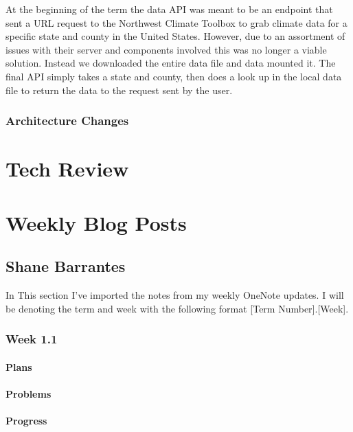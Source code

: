 \documentclass[onecolumn, draftclsnofoot,10pt, compsoc]{article}
\begin{document}
        At the beginning of the term the data API was meant to be an endpoint that sent a URL request to the Northwest Climate Toolbox to grab climate data for a specific state and county in the United States. However, due to an assortment of issues with their server and components involved this was no longer a viable solution. Instead we downloaded the entire data file and data mounted it. The final API simply takes a state and county, then does a look up in the local data file to return the data to the request sent by the user.

        \subsubsection{Architecture Changes}    

\section{Tech Review}
	

\section{Weekly Blog Posts}
    \subsection{Shane Barrantes}
        In This section I've imported the notes from my weekly OneNote updates. I will be denoting the term and week with the following format [Term Number].[Week].

        \subsubsection{Week 1.1}

		    \paragraph{Plans} \hfill \break

		    \paragraph{Problems} \hfill \break

		    \paragraph{Progress} \hfill \break
\end{document}
